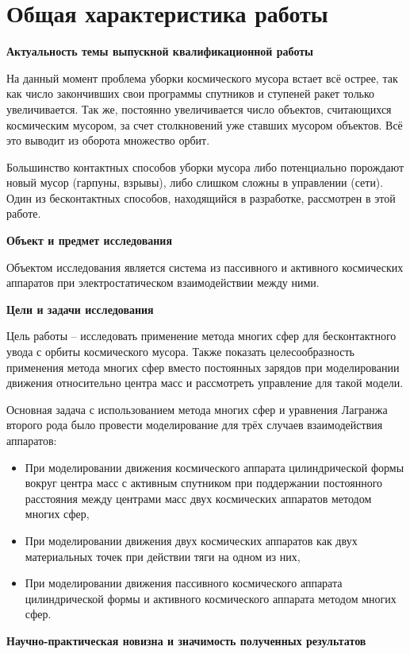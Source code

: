 \section*{Общая характеристика работы}
\textbf{Актуальность темы выпускной квалификационной работы}

На данный момент проблема уборки космического мусора встает всё острее, так как число закончивших свои программы спутников и ступеней ракет только увеличивается.
Так же, постоянно увеличивается число объектов, считающихся космическим мусором, за счет столкновений уже ставших мусором объектов.
Всё это выводит из оборота множество орбит.

Большинство контактных способов уборки мусора либо потенциально порождают новый мусор (гарпуны, взрывы), либо слишком сложны в управлении (сети).
Один из бесконтактных способов, находящийся в разработке, рассмотрен в этой работе.

\textbf{Объект и предмет исследования}

Объектом исследования является система из пассивного и активного космических аппаратов при электростатическом взаимодействии между ними.

\textbf{Цели и задачи исследования}

Цель работы – исследовать применение метода многих сфер  для бесконтактного увода с орбиты космического мусора.
Также показать целесообразность применения метода многих сфер вместо постоянных зарядов при моделировании движения относительно центра масс и рассмотреть управление для такой модели.

Основная задача с использованием метода многих сфер и уравнения Лагранжа второго рода было провести моделирование для трёх случаев взаимодействия аппаратов:
\begin{itemize}
	\item При моделировании движения космического аппарата цилиндрической формы вокруг центра масс с активным спутником при поддержании постоянного расстояния между центрами масс двух космических аппаратов методом многих сфер,
	\item При моделировании движения двух космических аппаратов как двух материальных точек при действии тяги на одном из них,
	\item При моделировании движения пассивного космического аппарата цилиндрической формы и активного космического аппарата методом многих сфер.
\end{itemize}

\textbf{Научно-практическая новизна и значимость полученных результатов}

